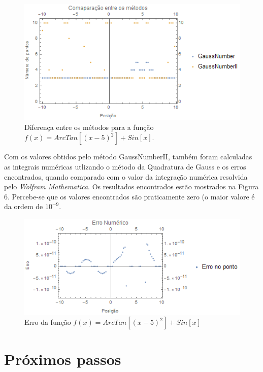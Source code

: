 \documentclass[12pt,a4paper]{article}
\begin{document}
\begin{figure}[H]
\begin{center}
\includegraphics{images/comparacao_arctangsin}
\caption{Diferença entre os métodos para a função $f(x)=ArcTan[(x-5)^{2}]+Sin[x]$.}
\end{center}
\end{figure}

\newpage
\quad Com os valores obtidos pelo método GaussNumberII, também foram calculadas as integrais numéricas utlizando o método da Quadratura de Gauss e os erros encontrados, quando comparado com o valor da integração numérica resolvida pelo \textit{Wolfram Mathematica}. Os resultados encontrados estão mostrados na Figura 6. Percebe-se que os valores encontrados são praticamente zero (o maior valore é da ordem de $10^{-9}$.


\begin{figure}[H]
\begin{center}
\includegraphics{images/erro_arctangsin}
\caption{Erro da função $f(x)=ArcTan[(x-5)^{2}]+Sin[x]$}
\end{center}
\end{figure}



\newpage
\section{Próximos passos}
\end{document}
